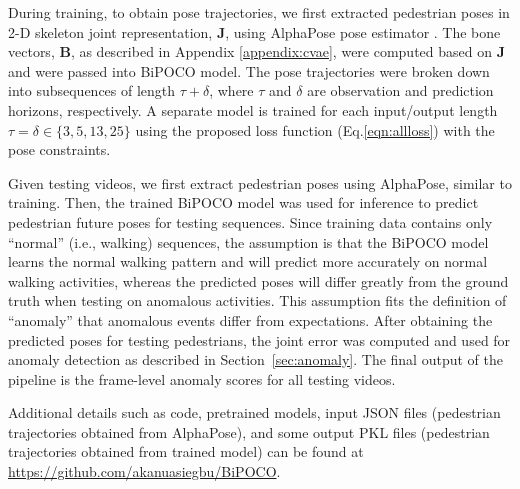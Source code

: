 \documentclass[nohyperref]{article}
\theoremstyle{plain}
\theoremstyle{definition}
\theoremstyle{remark}
\begin{document}
During training, to obtain pose trajectories, we first extracted pedestrian poses in 2-D skeleton joint representation, $\mathbf{J}$, using AlphaPose pose estimator \cite{fang2017rmpe,xiu2018poseflow}. The bone vectors, $\mathbf{B}$, as described in Appendix \ref{appendix:cvae}, were computed based on $\mathbf{J}$ and were passed into BiPOCO model. The pose trajectories were broken down into subsequences of length $\tau+\delta$, where $\tau$ and $\delta$ are observation and prediction horizons, respectively. A separate model is trained for each input/output length $\tau=\delta\in \{3,5,13,25\}$ using the proposed loss function (Eq.\eqref{eqn:allloss}) with the pose constraints. 

Given testing videos, we first extract pedestrian poses using AlphaPose, similar to training. Then, the trained BiPOCO model was used for inference to predict pedestrian future poses for testing sequences. Since training data contains only ``normal'' (i.e., walking) sequences, the assumption is that the BiPOCO model learns the normal walking pattern and will predict more accurately on normal walking activities, whereas the predicted poses will differ greatly from the ground truth when testing on anomalous activities. This assumption fits the definition of ``anomaly'' that anomalous events differ from expectations. After obtaining the predicted poses for testing pedestrians, the joint error was computed and used for anomaly detection as described in Section~\ref{sec:anomaly}. The final output of the pipeline is the frame-level anomaly scores for all testing videos.

Additional details such as code, pretrained models, input JSON files (pedestrian trajectories obtained from AlphaPose), and some output PKL files (pedestrian trajectories obtained from trained model) can be found at  \url{https://github.com/akanuasiegbu/BiPOCO}.
\end{document}
